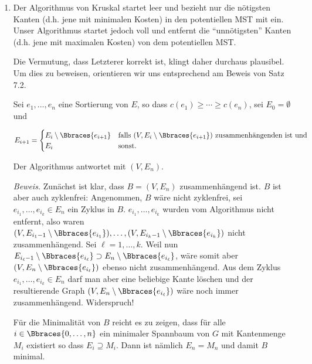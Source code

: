\begin{solution}

\phantom{}

\begin{enumerate}[label = (\Alph*)]

    \item Der Algorithmus von Kruskal startet leer und bezieht nur die nötigsten Kanten (d.h. jene mit minimalen Kosten) in den potentiellen MST mit ein.
    Unser Algorithmus startet jedoch voll und entfernt die \enquote{unnötigsten} Kanten (d.h. jene mit maximalen Kosten) von dem potentiellen MST.

    Die Vermutung, dass Letzterer korrekt ist, klingt daher durchaus plausibel.
    Um dies zu beweisen, orientieren wir uns entsprechend am Beweis von Satz 7.2.

    Sei $e_1, \dots, e_n$ eine Sortierung von $E$, so dass $c(e_1) \geq \cdots \geq c(e_n)$, sei $E_0 = \emptyset$ und

    \begin{align*}
        E_{i+1}
        =
        \begin{cases}
            E_i \setminus \Bbraces{e_{i+1}} & \text{falls}~ (V, E_i \setminus \Bbraces{e_{i+1}}) ~\text{zusammenhängenden ist und} \\
            E_i                             & \text{sonst.}
        \end{cases}
    \end{align*}

    Der Algorithmus antwortet mit $(V, E_n)$.

    \textit{Beweis.}
    Zunächst ist klar, dass $B = (V, E_n)$ zusammenhängend ist.
    $B$ ist aber auch zyklenfrei:
    Angenommen, $B$ wäre nicht zyklenfrei, sei $e_{i_1}, \dots, e_{i_k} \in E_n$ ein Zyklus in $B$.
    $e_{i_1}, \dots, e_{i_k}$ wurden vom Algorithmus nicht entfernt, also waren $(V, E_{i_1 - 1} \setminus \Bbraces{e_{i_1}}), \dots, (V, E_{i_k - 1} \setminus \Bbraces{e_{i_k}})$ nicht zusammenhängend.
    Sei $\ell = 1, \dots, k$.
    Weil nun $E_{i_\ell - 1} \setminus \Bbraces{e_{i_\ell}} \supset E_n \setminus \Bbraces{e_{i_\ell}}$, wäre somit aber $(V, E_n \setminus \Bbraces{e_{i_\ell}})$ ebenso nicht zusammenhängend.
    Aus dem Zyklus $e_{i_1}, \dots, e_{i_k} \in E_n$ darf man aber eine beliebige Kante löschen und der resultierende Graph $(V, E_n \setminus \Bbraces{e_{i_\ell}})$ wäre noch immer zusammenhängend.
    Widerspruch!

    Für die Minimalität von $B$ reicht es zu zeigen, dass für alle $i \in \Bbraces{0, \dots, n}$ ein minimaler Spannbaum von $G$ mit Kantenmenge $M_i$ existiert so dass $E_i \supseteq M_i$.
    Dann ist nämlich $E_n = M_n$ und damit $B$ minimal.


\end{enumerate}
\end{solution}
